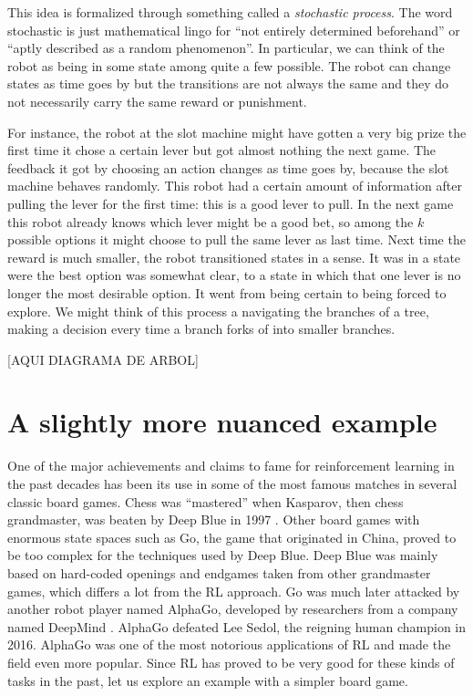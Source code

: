 This idea is formalized through something called a 
\textit{stochastic process}. The word stochastic is just 
mathematical lingo for ``not entirely determined beforehand'' 
or ``aptly described as a random phenomenon''.  In particular, 
we can think of the robot as being in some state among quite a 
few possible. The robot can change states as time goes by but 
the transitions are not always the same and they do not 
necessarily carry the same reward or punishment.

For instance, the robot at the slot machine might have gotten a 
very big prize the first time it chose a certain lever but got 
almost nothing the next game. The feedback it got by choosing 
an action changes as time goes by, because the slot machine 
behaves randomly. This robot had a certain amount of 
information after pulling the lever for the first time: this is 
a good lever to pull. In the next game this robot already knows 
which lever might be a good bet, so among the $k$ possible 
options it might choose to pull the same lever as last time. 
Next time the reward is much smaller, the robot transitioned 
states in a sense. It was in a state were the best option was 
somewhat clear, to a state in which that one lever is no longer 
the most desirable option. It went from being certain to being 
forced to explore. We might think of this process a navigating 
the branches of a tree, making a decision every time a branch 
forks of into smaller branches.

[AQUI DIAGRAMA DE ARBOL]

\section{A slightly more nuanced example}
One of the major achievements and claims to fame for 
reinforcement learning in the past decades has been its use in 
some of the most famous matches in several classic board games.  
Chess was ``mastered'' when Kasparov, then chess grandmaster, 
was beaten by Deep Blue in 1997 \cite{silver2018chess}. Other 
board games with enormous state spaces such as Go, the game 
that originated in China, proved to be too complex for the 
techniques used by Deep Blue. Deep Blue was mainly based on 
hard-coded openings and endgames taken from other grandmaster 
games, which differs a lot from the RL approach. Go was much 
later attacked by another robot player named AlphaGo, developed 
by researchers from a company named DeepMind 
\cite{silver2017mastering}.  AlphaGo defeated Lee Sedol, the 
reigning human champion in 2016.  AlphaGo was one of the most 
notorious applications of RL and made the field even more 
popular. Since RL has proved to be very good for these kinds of 
tasks in the past, let us explore an example with a simpler 
board game.

